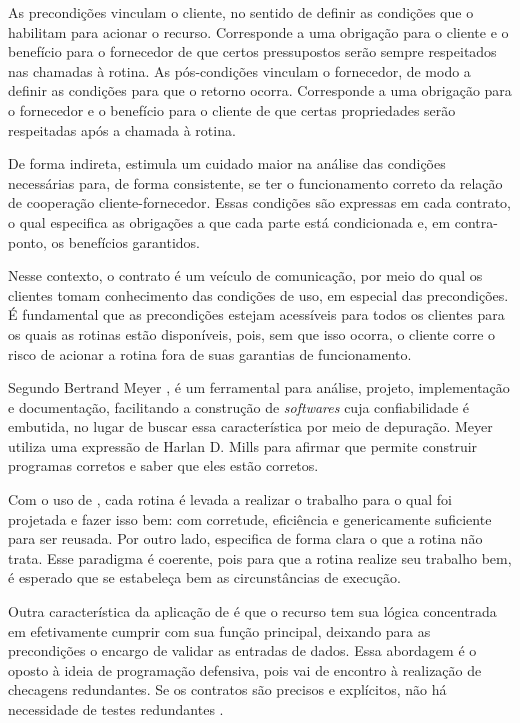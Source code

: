 As precondições vinculam o cliente, no sentido de definir as condições que
o habilitam para acionar o recurso. Corresponde a uma obrigação para o cliente e
o benefício para o fornecedor \cite{meyer1997object} de que certos
pressupostos serão sempre respeitados nas chamadas à rotina.
As pós-condições vinculam o fornecedor, de modo a definir as condições para que o retorno ocorra.
Corresponde a uma obrigação para o fornecedor e o benefício para o cliente de
que certas propriedades serão respeitadas após a chamada à rotina.

De forma indireta, \designbycontract{} estimula um cuidado maior na análise das
condições necessárias para, de forma consistente, se ter o funcionamento correto
da relação de cooperação cliente-fornecedor.
Essas condições são expressas em cada contrato, o qual especifica as obrigações
a que cada parte está condicionada e, em contra-ponto, os benefícios garantidos.

Nesse contexto, o contrato é um veículo de comunicação, por meio do qual os
clientes tomam conhecimento das condições de uso, em especial das precondições.
É fundamental que as precondições estejam acessíveis para todos os clientes
para os quais as rotinas estão disponíveis, pois, sem que isso ocorra, o cliente
corre o risco de acionar a rotina fora de suas garantias de funcionamento. 

Segundo Bertrand Meyer \cite{meyer1997object}, \designbycontract{} é um
ferramental para análise, projeto, implementação e documentação, facilitando a
construção de \textit{softwares} cuja confiabilidade é embutida, no lugar de
buscar essa característica por meio de depuração. Meyer utiliza uma expressão de
Harlan D. Mills \cite{mills1975new} para afirmar que \designbycontract{} permite
construir programas corretos e saber que eles estão corretos.

Com o uso de \designbycontract{}, cada rotina é levada a realizar o trabalho
para o qual foi projetada e fazer isso bem: com corretude, eficiência e
genericamente suficiente para ser reusada. Por outro lado, especifica de forma
clara o que a rotina não trata. Esse paradigma é coerente, pois para que a
rotina realize seu trabalho bem, é esperado que se estabeleça bem as
circunstâncias de execução.

Outra característica da aplicação de \designbycontract{} é que o recurso tem sua
lógica concentrada em efetivamente cumprir com sua função principal, deixando
para as precondições o encargo de validar as entradas de dados. Essa abordagem
é o oposto à ideia de programação defensiva, pois vai de encontro à realização
de checagens redundantes. Se os contratos são precisos e explícitos, não há
necessidade de testes redundantes \cite{meyer1992applying}.

